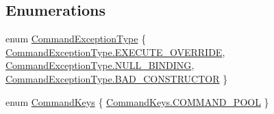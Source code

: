 \subsection*{Enumerations}
\begin{DoxyCompactItemize}
\item 
enum \hyperlink{namespacestrange_1_1extensions_1_1command_1_1api_a27c9226cc8d55624f3294319d48879e3}{Command\-Exception\-Type} \{ \hyperlink{namespacestrange_1_1extensions_1_1command_1_1api_a27c9226cc8d55624f3294319d48879e3a649c27d7db043238f4e8ee0d1c8c52fc}{Command\-Exception\-Type.\-E\-X\-E\-C\-U\-T\-E\-\_\-\-O\-V\-E\-R\-R\-I\-D\-E}, 
\hyperlink{namespacestrange_1_1extensions_1_1command_1_1api_a27c9226cc8d55624f3294319d48879e3a35310c46c16e400ec14d3f312e93ec71}{Command\-Exception\-Type.\-N\-U\-L\-L\-\_\-\-B\-I\-N\-D\-I\-N\-G}, 
\hyperlink{namespacestrange_1_1extensions_1_1command_1_1api_a27c9226cc8d55624f3294319d48879e3a4ca656dfba09ff902c42fee01c7c8405}{Command\-Exception\-Type.\-B\-A\-D\-\_\-\-C\-O\-N\-S\-T\-R\-U\-C\-T\-O\-R}
 \}
\item 
enum \hyperlink{namespacestrange_1_1extensions_1_1command_1_1api_a1c85c3b8ce0d2754e546c4811a778bf2}{Command\-Keys} \{ \hyperlink{namespacestrange_1_1extensions_1_1command_1_1api_a1c85c3b8ce0d2754e546c4811a778bf2a11560d716ee1c95a45a26442ac42c974}{Command\-Keys.\-C\-O\-M\-M\-A\-N\-D\-\_\-\-P\-O\-O\-L}
 \}
\end{DoxyCompactItemize}


